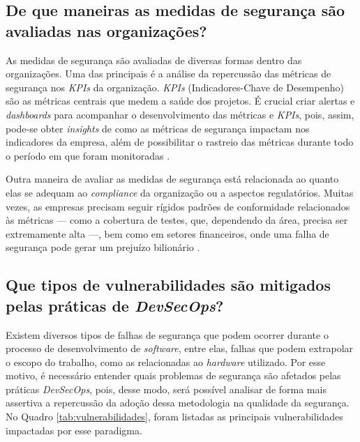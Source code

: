 \subsection{De que maneiras as medidas de segurança são avaliadas nas organizações?}

As medidas de segurança são avaliadas de diversas formas dentro das organizações. Uma das principais é a análise da repercussão das métricas de segurança nos \textit{KPIs} da organização. \textit{KPIs} (Indicadores-Chave de Desempenho) são as métricas centrais que medem a saúde dos projetos. É crucial criar alertas e \textit{dashboards} para acompanhar o desenvolvimento das métricas e \textit{KPIs}, pois, assim, pode-se obter \textit{insights} de como as métricas de segurança impactam nos indicadores da empresa, além de possibilitar o rastreio das métricas durante todo o período em que foram monitoradas \cite{Joshi20247}.

Outra maneira de avaliar as medidas de segurança está relacionada ao quanto elas se adequam ao \textit{compliance} da organização ou a aspectos regulatórios. Muitas vezes, as empresas precisam seguir rígidos padrões de conformidade relacionados às métricas — como a cobertura de testes, que, dependendo da área, precisa ser extremamente alta —, bem como em setores financeiros, onde uma falha de segurança pode gerar um prejuízo bilionário \cite{Kudriavtseva20241223}.

\subsection{Que tipos de vulnerabilidades são mitigados pelas práticas de \linebreak \textit{DevSecOps}?}

Existem diversos tipos de falhas de segurança que podem ocorrer durante o processo de desenvolvimento de \textit{software}, entre elas, falhas que podem extrapolar o escopo do trabalho, como as relacionadas ao \textit{hardware} utilizado. Por esse motivo, é necessário entender quais problemas de segurança são afetados pelas práticas \textit{DevSecOps}, pois, desse modo, será possível analisar de forma mais assertiva a repercussão da adoção dessa metodologia na qualidade da segurança. No Quadro \ref{tab:vulnerabilidades}, foram listadas as principais vulnerabilidades impactadas por esse paradigma.

